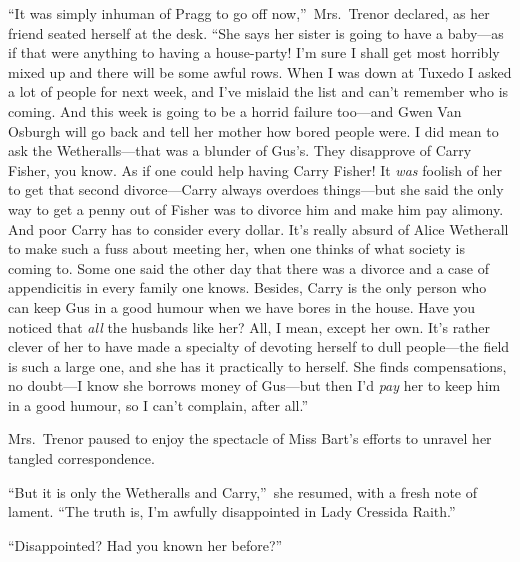 \documentclass[12pt,a4paper]{book}
\begin{document}
``It was simply inhuman of Pragg to go off now,''\ Mrs.\ Trenor
declared, as her friend seated herself at the desk. ``She says her
sister is going to have a baby---as if that were anything to
having a house-party! I'm sure I shall get most horribly mixed up
and there will be some awful rows. When I was down at Tuxedo I
asked a lot of people for next week, and I've mislaid the list
and can't remember who is coming. And this week is going to be a
horrid failure too---and Gwen Van Osburgh will go back and
tell her mother how bored people were. I did mean to ask the
Wetheralls---that was a blunder of Gus's. They disapprove of Carry
Fisher, you know. As if one could help having Carry Fisher! It
\textit{was} foolish of her to get that second divorce---Carry always
overdoes things---but she said the only way to get a penny out of
Fisher was to divorce him and make him pay alimony. And poor
Carry has to consider every dollar. It's really absurd of Alice
Wetherall to make such a fuss about meeting her, when one thinks
of what society is coming to. Some one said the other day that
there was a divorce and a case of appendicitis in every family
one knows. Besides, Carry is the only person who can keep Gus in
a good humour when we have bores in the house. Have you noticed
that \textit{all} the husbands like her? All, I mean, except her own. It's
rather clever of her to have made a specialty of devoting herself
to dull people---the field is such a large one, and she has it
practically to herself. She finds compensations, no doubt---I know
she borrows money of Gus---but then I'd \textit{pay} her to keep him in a
good humour, so I can't complain, after all.''





Mrs.\ Trenor paused to enjoy the spectacle of Miss Bart's efforts
to unravel her tangled correspondence.





``But it is only the Wetheralls and Carry,''\ she resumed, with a
fresh note of lament. ``The truth is, I'm awfully disappointed in
Lady Cressida Raith.''





``Disappointed? Had you known her before?''
\end{document}
